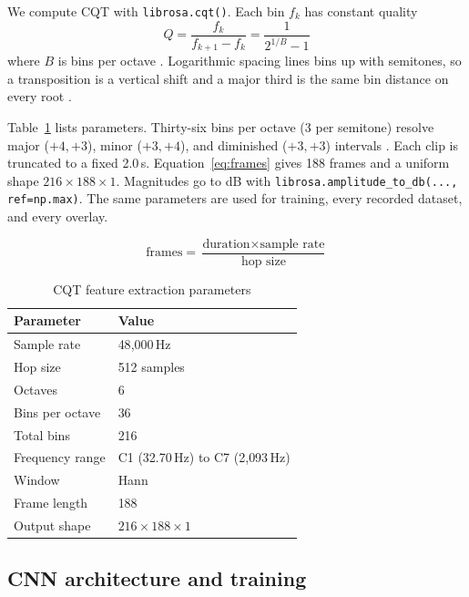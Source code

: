 \documentclass[pdflatex,sn-mathphys-num,iicol]{sn-jnl}
\theoremstyle{thmstyleone}
\theoremstyle{thmstyletwo}
\theoremstyle{thmstylethree}
\begin{document}
We compute CQT with \texttt{librosa.cqt()}. Each bin $f_k$ has constant quality
\begin{equation}
Q = \frac{f_k}{f_{k+1} - f_k} = \frac{1}{2^{1/B} - 1}
\label{eq:cqt}
\end{equation}
where $B$ is bins per octave \cite{Li2021}\cite{Lacoste2007}. Logarithmic spacing lines bins up with semitones, so a transposition is a vertical shift and a major third is the same bin distance on every root \cite{Harte2010}.

Table~\ref{tab:cqt-extraction-params} lists parameters. Thirty-six bins per octave (3 per semitone) resolve major ($+4,+3$), minor ($+3,+4$), and diminished ($+3,+3$) intervals \cite{Akram2025}\cite{OHanlon2021}. Each clip is truncated to a fixed 2.0\,s. Equation~\ref{eq:frames} gives 188 frames and a uniform shape $216 \times 188 \times 1$. Magnitudes go to dB with \texttt{librosa.amplitude\_to\_db(..., ref=np.max)}. The same parameters are used for training, every recorded dataset, and every overlay.

\begin{equation}
\text{frames} = \frac{\text{duration} \times \text{sample rate}}{\text{hop size}}
\label{eq:frames}
\end{equation}

\begin{table}[t]
\caption{CQT feature extraction parameters}\label{tab:cqt-extraction-params}
\begin{tabular}{@{}ll@{}}
\toprule
Parameter & Value \\
\midrule
Sample rate & 48{,}000\,Hz \\
Hop size & 512 samples \\
Octaves & 6 \\
Bins per octave & 36 \\
Total bins & 216 \\
Frequency range & C1 (32.70\,Hz) to C7 (2{,}093\,Hz) \\
Window & Hann \\
Frame length & 188 \\
Output shape & $216 \times 188 \times 1$ \\
\bottomrule
\end{tabular}
\end{table}

\subsection{CNN architecture and training}\label{subsec3_3}
\end{document}
